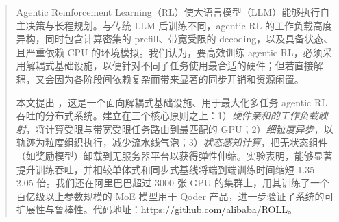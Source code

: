 \begin{abstract}
Agentic Reinforcement Learning（RL）使大语言模型（LLM）能够执行自主决策与长程规划。与传统 LLM 后训练不同，agentic RL 的工作负载高度异构，同时包含计算密集的 prefill、带宽受限的 decoding，以及具备状态、且严重依赖 CPU 的环境模拟。我们认为，要高效训练 agentic RL，必须采用解耦式基础设施，以便针对不同子任务使用最合适的硬件；但若直接解耦，又会因为各阶段间依赖复杂而带来显著的同步开销和资源闲置。

本文提出 \SystemName{}，这是一个面向解耦式基础设施、用于最大化多任务 agentic RL 吞吐的分布式系统。\SystemName{}建立在三个核心原则之上：1）\emph{硬件亲和的工作负载映射}，将计算受限与带宽受限任务路由到最匹配的 GPU；2）\emph{细粒度异步}，以轨迹为粒度组织执行，减少流水线气泡；3）\emph{状态感知计算}，把无状态组件（如奖励模型）卸载到无服务器平台以获得弹性伸缩。实验表明，\SystemName{}能够显著提升训练吞吐，并相较单体式和同步式基线将端到端训练时间缩短 1.35--2.05 倍。我们还在阿里巴巴超过 3000 张 GPU 的集群上，用其训练了一个百亿级以上参数规模的 MoE 模型用于 Qoder 产品，进一步验证了系统的可扩展性与鲁棒性。代码地址：\url{https://github.com/alibaba/ROLL}。
\end{abstract}
